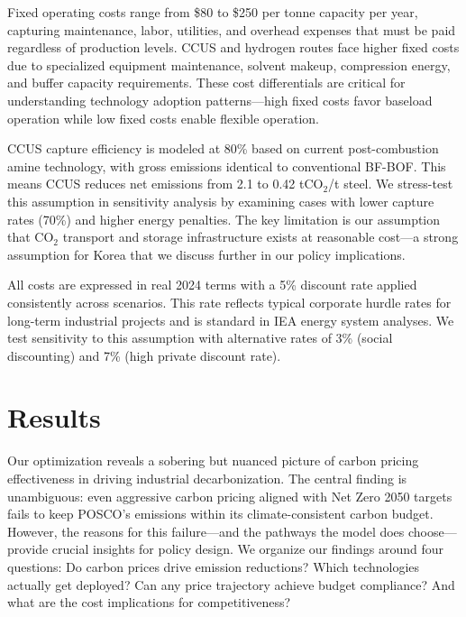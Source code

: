 \documentclass[preprint,1p,authoryear]{elsarticle}
\begin{document}
Fixed operating costs range from \$80 to \$250 per tonne capacity per year, capturing maintenance, labor, utilities, and overhead expenses that must be paid regardless of production levels. CCUS and hydrogen routes face higher fixed costs due to specialized equipment maintenance, solvent makeup, compression energy, and buffer capacity requirements. These cost differentials are critical for understanding technology adoption patterns—high fixed costs favor baseload operation while low fixed costs enable flexible operation.

CCUS capture efficiency is modeled at 80\% based on current post-combustion amine technology, with gross emissions identical to conventional BF-BOF. This means CCUS reduces net emissions from 2.1 to 0.42 tCO$_2$/t steel. We stress-test this assumption in sensitivity analysis by examining cases with lower capture rates (70\%) and higher energy penalties. The key limitation is our assumption that CO$_2$ transport and storage infrastructure exists at reasonable cost—a strong assumption for Korea that we discuss further in our policy implications.

All costs are expressed in real 2024 terms with a 5\% discount rate applied consistently across scenarios. This rate reflects typical corporate hurdle rates for long-term industrial projects and is standard in IEA energy system analyses. We test sensitivity to this assumption with alternative rates of 3\% (social discounting) and 7\% (high private discount rate).





\section{Results}

Our optimization reveals a sobering but nuanced picture of carbon pricing effectiveness in driving industrial decarbonization. The central finding is unambiguous: even aggressive carbon pricing aligned with Net Zero 2050 targets fails to keep POSCO's emissions within its climate-consistent carbon budget. However, the reasons for this failure—and the pathways the model does choose—provide crucial insights for policy design. We organize our findings around four questions: Do carbon prices drive emission reductions? Which technologies actually get deployed? Can any price trajectory achieve budget compliance? And what are the cost implications for competitiveness?
\end{document}
